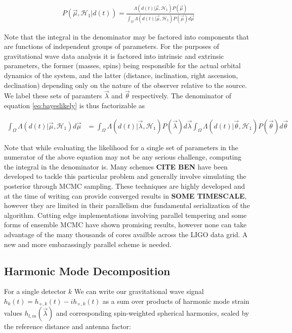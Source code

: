 \documentclass[paper=a4, fontsize=11pt]{scrartcl} %
\numberwithin{equation}{section} %
\numberwithin{figure}{section} %
\numberwithin{table}{section} %
\begin{document}
\begin{align}\label{eq:bayeslikely}
P(\vec{\mu}, \mathcal{H}_1|d(t)) = \frac{\Lambda(d(t)|\vec{\mu}, \mathcal{H}_1)P(\vec{\mu})}{\int_{\Omega}\Lambda(d(t)|\vec{\mu}, \mathcal{H}_1)P(\vec{\mu})d\vec{\mu}}
\end{align}

Note that the integral in the denominator may be factored into components that are functions of independent groups of parameters. For the purposes of gravitational wave data analysis it is factored into intrinsic and extrinsic parameters, the former (masses, spins) being responsible for the actual orbital dynamics of the system, and the latter (distance, inclination, right ascension, declination) depending only on the nature of the observer relative to the source. We label these sets of paramters $\vec{\lambda}$ and $\vec{\theta}$ respectively. The denominator of equation \ref{eq:bayeslikely} is thus factorizable as 

\begin{align}
\int_{\Omega}\Lambda(d(t)|\vec{\mu}, \mathcal{H}_1)d\vec{\mu} &= \int_{\Omega}\Lambda(d(t)|\vec{\lambda}, \mathcal{H}_1)P(\vec{\lambda})d\vec{\lambda}\int_{\Omega}\Lambda(d(t)|\vec{\theta}, \mathcal{H}_1)P(\vec{\theta})d\vec{\theta} 
\end{align} 

Note that while evaluating the likelihood for a single set of parameters in the numerator of the above equation may not be any serious challenge, computing the integral in the denominator is. Many schemes \textbf{CITE BEN} have been developed to tackle this particular problem and generally involve simulating the posterior through MCMC sampling. These techniques are highly developed and at the time of writing can provide converged results in \textbf{SOME TIMESCALE}, however they are limited in their parallelism due fundamental serialization of the algorithm. Cutting edge implementations involving parallel tempering and some forms of ensemble MCMC have shown promising results, however none can take advantage of the many thousands of cores availble across the LIGO data grid. A new and more embarassingly parallel scheme is needed.  

\subsection{Harmonic Mode Decomposition}

For a single detector $k$ We can write our gravitational wave signal $h_k(t) = h_{+,k}(t) - ih_{\times, k}(t)$ as a sum over products of harmonic mode strain values $h_{l,m}(\vec{\lambda})$ and corresponding spin-weighted spherical harmonics, scaled by the reference distance and antenna factor:
\end{document}
